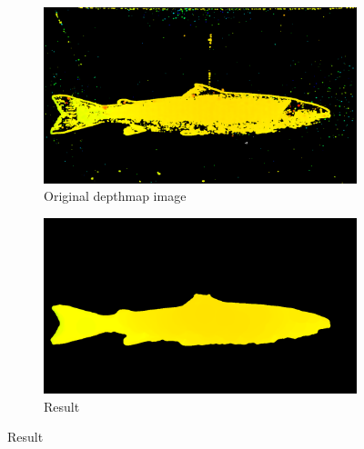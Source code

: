 \begin{figure}[H]
    \medskip
    \begin{subfigure}{0.48\textwidth}
        \includegraphics[width=\linewidth]{images/implementation/algorithm_test/original_73}
        \caption{Original depthmap image} 
        \label{fig:original_depthmap_73}
    \end{subfigure}\hspace*{\fill}
    \begin{subfigure}{0.48\textwidth}
        \includegraphics[width=\linewidth]{images/implementation/algorithm_test/median_filter_63}
        \caption{Result} 
        \label{fig:result_73}
    \end{subfigure}
    

\end{figure}
